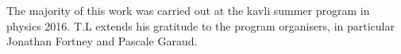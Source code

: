 \documentclass[a4paper,fleqn,usenatbib]{mnras}
\begin{document}
The majority of this work was carried out at the kavli summer program in physics 2016. T.L extends his gratitude to the program organisers, in particular Jonathan Fortney and Pascale Garaud.





%











\bsp	%
\label{lastpage}
\end{document}
